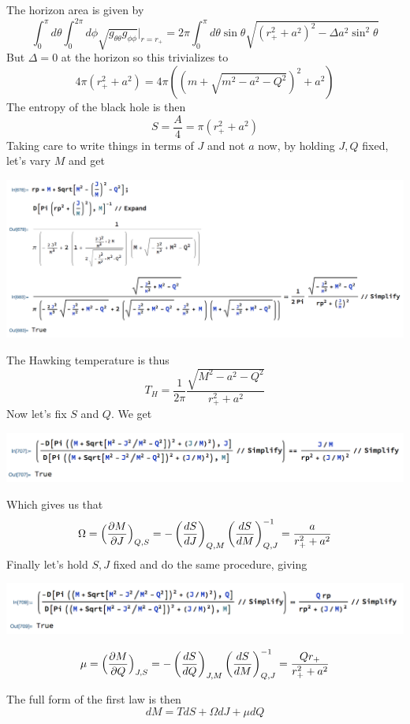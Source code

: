 \documentclass[11pt, class=article, crop=false]{standalone}
\begin{document}
\begin{enumerate}
	The horizon area is given by 
	\[
		\int_0^\pi d\theta \int_0^{2\pi} d\phi \sqrt{g_{\theta \theta} g_{\phi \phi}}\Big|_{r = r_+}  = 2 \pi \int_0^\pi d\theta \sin \theta \sqrt{(r^2_+ + a^2)^2 - \Delta a^2 \sin^2 \theta}
	\]
	But $\Delta = 0$ at the horizon so this trivializes to
	\[
		4 \pi (r_+^2 + a^2) = 4 \pi ((m + \sqrt{m^2 - a^2 - Q^2})^2 + a^2)
	\]
	The entropy of the black hole is then
	\[
		S = \frac{A}{4} = \pi (r_+^2 + a^2)
	\]
	Taking care to write things in terms of  $J$ and not $a$ now, by holding $J, Q$ fixed, let's vary $M$ and get
	\begin{center}
		\includegraphics[scale=0.4]{"Figures/Hawking T"}
	\end{center}
	The Hawking temperature is thus
	\[
		T_H = \frac{1}{2\pi} \frac{\sqrt{M^2 - a^2 - Q^2}}{r_+^2 + a^2}
	\]
	Now let's fix $S$ and $Q$. We get 
	\begin{center}
		\includegraphics[scale=0.4]{"Figures/J pot"}
	\end{center}
	Which gives us that 
	\[
		\Omega = \Big(\frac{\partial M}{\partial J}\Big)_{Q,S} = -\left(\frac{dS}{dJ}\right)_{Q,M} \left(\frac{dS}{dM}\right)^{-1}_{Q,J} = \frac{a}{r_+^2 + a^2}
	\]
	Finally let's hold $S, J$ fixed and do the same procedure, giving
	\begin{center}
		\includegraphics[scale=0.4]{"Figures/Q pot"}
	\end{center}
	\[
		\mu = \Big(\frac{\partial M}{\partial Q}\Big)_{J,S} = -\left(\frac{dS}{dQ}\right)_{J,M} \left(\frac{dS}{dM}\right)^{-1}_{Q,J} = \frac{Q r_+}{r_+^2 + a^2}
	\]
	
	The full form of the first law is then
	\[
		dM = T dS + \Omega dJ + \mu dQ
	\]
	

\end{enumerate}
\end{document}
